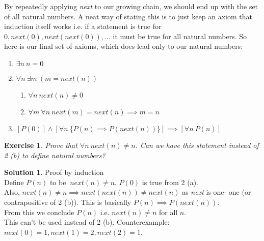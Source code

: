\documentclass[a4paper,10pt]{article}
\newtheorem{exercise}{Exercise}[section]
\theoremstyle{definition} %
\newtheorem*{solution}{Solution}
\begin{document}
    By repeatedly applying \emph{next} to our growing chain, we should end up 
    with the set of all natural numbers. A neat way of stating this is to just
    keep an axiom that induction itself works i.e. if a statement is true for 
    $0, next(0), next(next(0)), \dots$ it must be true for all natural numbers.
    So here is our final set of axioms, which does lead only to our natural numbers:

    \begin{tcolorbox}[colback=blue!10!white, colframe=blue!50!black]
        \begin{enumerate}
            \item $\exists n \ n = 0$
            \item $\forall n \ \exists m \ (m = next(n))$
            \begin{enumerate}
                \item $\forall n \ next(n) \neq 0$
                \item $\forall m \ \forall n \ next(m) = next(n) \implies m = n$
            \end{enumerate}
            \item $[P(0)] \wedge [\forall n \ \{P(n) \implies P(next(n))\}] \implies [\forall n \ P(n)]$
        \end{enumerate}
    \end{tcolorbox}

    \begin{exercise}
        Prove that $\forall n \ next(n) \neq n$. Can we have this statement instead of 
        2 (b) to define natural numbers?
    \end{exercise}
    \begin{solution}
        Proof by induction \\
        Define $P(n)$ to be $\ next(n) \neq n$. $P(0)$ is true from 2 (a). \\
        Also, $next(n) \neq n \implies next(next(n)) \neq next(n)$ as \emph{next} is one-
        one (or contrapositive of 2 (b)). This is basically $P(n) \implies P(next(n))$. \\
        From this we conclude $P(n)$ i.e. $next(n) \neq n$ for all $n$. \\
        This can't be used instead of 2 (b). Counterexample: $next(0) = 1, next(1) = 2, next(2) = 1$.
    \end{solution}
\end{document}
